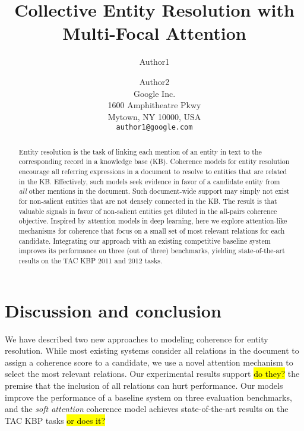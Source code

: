 \documentclass[11pt]{article}
\title{Collective Entity Resolution with Multi-Focal Attention}
\author{Author1 \and Author2\\
	    Google Inc. \\
	    1600 Amphitheatre Pkwy\\
	    Mytown, NY 10000, USA\\
	    {\tt author1@google.com}}
\date{}
\begin{document}
\maketitle

\begin{abstract}
Entity resolution is the task of linking each mention of an entity in
text to the corresponding record in a knowledge base (KB).  Coherence
models for entity resolution encourage all referring expressions in a
document to resolve to entities that are related in the KB.
Effectively, such models seek evidence in favor of a candidate entity
from \emph{all} other mentions in the document.  Such document-wide
support may simply not exist for non-salient entities that are not
densely connected in the KB.  The result is that valuable signals in
favor of non-salient entities get diluted in the all-pairs coherence
objective.  Inspired by attention models in deep learning, here we
explore attention-like mechanisms for coherence that focus on a small
set of most relevant relations for each candidate.  Integrating our
approach with an existing competitive baseline system improves its
performance on three (out of three) benchmarks, yielding
state-of-the-art results on the TAC KBP 2011 and 2012 tasks.
\end{abstract}










\section{Discussion and conclusion}
We have described two new approaches to modeling coherence for entity resolution. While most existing systems consider all relations in the document to assign a coherence score to a candidate, we use a novel attention mechanism to select the most relevant relations. Our experimental results support \hl{do they?} the premise that the inclusion of all relations can hurt performance. Our models improve the performance of a baseline system on three evaluation benchmarks, and the \emph{soft attention} coherence model achieves state-of-the-art results on the TAC KBP tasks \hl{or does it?}




\begin{small}


\end{small}
\end{document}
